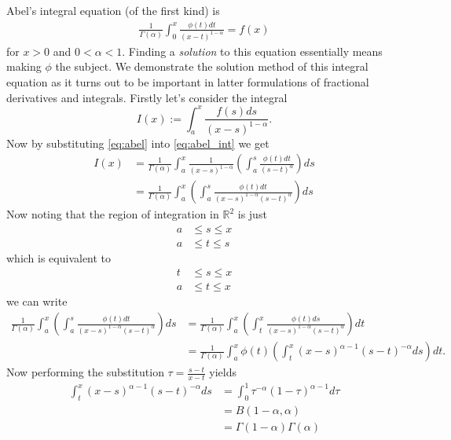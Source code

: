 Abel's integral equation (of the first kind) is 
\begin{align}
    \label{eq:abel}
    \frac{1}{\Gamma(\alpha)} \int_0^x \frac{\phi(t)dt}{(x-t)^{1-\alpha}} = f(x) 
\end{align}
for $ x > 0 $ and $ 0 < \alpha < 1 $. Finding a \emph{solution} to this equation essentially means making $ \phi $ the subject. 
We demonstrate the solution method of this integral equation as it turns out to be important in latter formulations of fractional derivatives and integrals.
Firstly let's consider the integral 
\begin{equation}
	\label{eq:abel_int}
	I(x) := \int_a^x \frac{f(s)ds}{(x-s)^{1-\alpha}}.
\end{equation}
Now by substituting \eqref{eq:abel} into \eqref{eq:abel_int} we get 
\begin{align}
	I(x) &= \frac{1}{\Gamma(\alpha)} \int_a^x \frac{1}{(x-s)^{1-\alpha}} \left( \int_a^s \frac{\phi(t)dt}{(s-t)^\alpha} \right) ds \\
		&= \frac{1}{\Gamma(\alpha)} \int_a^x \left( \int_a^s \frac{\phi(t)dt}{(x-s)^{1-\alpha}(s-t)^\alpha} \right) ds
\end{align}
Now noting that the region of integration in $ \mathbb{R}^2 $ is just
\begin{align}
	a &\leq s \leq x \\
	a &\leq t \leq s 
\end{align}
which is equivalent to 
\begin{align}
	t &\leq s \leq x \\
	a &\leq t \leq x 
\end{align}
we can write 
\begin{align}
	\frac{1}{\Gamma(\alpha)} \int_a^x \left( \int_a^s \frac{\phi(t)dt}{(x-s)^{1-\alpha}(s-t)^\alpha} \right) ds 
		&= \frac{1}{\Gamma(\alpha)} \int_a^x \left( \int_t^x \frac{\phi(t)ds}{(x-s)^{1-\alpha}(s-t)^\alpha} \right) dt \nonumber \\
		\label{eqn:prebeta}
		&= \frac{1}{\Gamma(\alpha)} \int_a^x \phi(t) \left( \int_t^x (x-s)^{\alpha-1}(s-t)^{-\alpha} ds\right) dt. 
\end{align}
Now performing the substitution $ \tau = \frac{s-t}{x-t} $ yields 
\begin{align}
	\int_t^x (x-s)^{\alpha-1}(s-t)^{-\alpha} ds &= \int_0^1 \tau^{-\alpha} (1-\tau)^{\alpha - 1} d\tau \\
		&= B(1-\alpha,\alpha) \\
		&= \Gamma(1-\alpha)\Gamma(\alpha)
\end{align}
